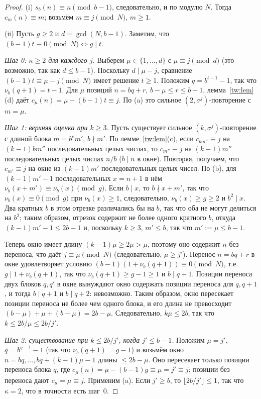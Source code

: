 \documentclass[a4paper,14pt]{extreport}
\theoremstyle{plain}
\theoremstyle{definition}
\theoremstyle{remark}
\begin{document}
\begin{proof}
	(i) $s_b(n)\equiv n\pmod{b-1}$, следовательно, и по модулю $N$. Тогда $c_m(n)\equiv m$; возьмём $m\equiv j\pmod N$, $m\ge1$.
	
	(ii) Пусть $g\ge2$ и $d=\gcd(N,b-1)$. Заметим, что $(b-1)t\equiv0\pmod N\iff g\mid t$.
	
	\emph{Шаг 0: $\kappa\ge2$ для каждого $j$.} Выберем $\mu\in\{1,\dots,d\}$ с $\mu\equiv j\pmod d$
	(это возможно, так как $d\le b-1$). Поскольку $d\mid\mu-j$, сравнение $(b-1)t\equiv\mu-j\pmod N$ имеет решение
	$t\ge1$. Положим $q=b^{t-1}-1$, так что $\nu_b(q+1)=t-1$. Для $\mu$ позиций $n=bq+r$, $b-\mu\le r\le b-1$,
	лемма~\ref{tw:lem}(d) даёт $c_\mu(n)=\mu-(b-1)t\equiv j$. По (a) это сильное $(2,\sigma^j)$-повторение с $m=\mu$.
	
	\emph{Шаг 1: верхняя оценка при $k\ge3$.} Пусть существует сильное $(k,\sigma^j)$-повторение с длиной блока $m=b^em'$, $b\nmid m'$.
	По лемме~\ref{tw:lem}(c), если $c_{bm''}\equiv j$ на $(k-1)bm''$ последовательных целых числах, то
	$c_{m''}\equiv j$ на $(k-1)m''$ последовательных целых числах $n/b$ ($b\mid n$ в окне).
	Повторяя, получаем, что $c_{m'}\equiv j$ на окне из $(k-1)m'$ последовательных целых чисел.
	По (b), для $(k-1)m'-1$ последовательных $x=n+1$ в нём $\nu_b(x+m')\equiv\nu_b(x)\pmod g$. Если $b\mid x$, то $b\nmid x+m'$,
	так что $\nu_b(x)\equiv0\pmod g$ при $\nu_b(x)\ge1$, следовательно, $\nu_b(x)\ge g\ge2$ и $b^2\mid x$.
	Два кратных $b$ в этом отрезке различались бы на $b$, так что оба не могут делиться на $b^2$; таким образом, отрезок
	содержит не более одного кратного $b$, откуда $(k-1)m'-1\le 2b-1$ и, поскольку $k\ge3$, $m'\le b$, так что $m':=\mu\le b-1$.
	
	Теперь окно имеет длину $(k-1)\mu\ge2\mu>\mu$, поэтому оно содержит $n$ без переноса, что даёт $j\equiv\mu\pmod N$
	(следовательно, $\mu\ge j'$). Перенос $n=bq+r$ в окне удовлетворяет условию
	$(b-1)(1+\nu_b(q+1))\equiv0\pmod N$, т.е.\ $g\mid 1+\nu_b(q+1)$, так что $\nu_b(q+1)\ge g-1\ge1$ и $b\mid q+1$.
	Позиции переноса двух блоков $q,q'$ в окне вынуждают окно содержать позиции переноса для $q,q+1$,
	и тогда $b\mid q+1$ и $b\mid q+2$: невозможно. Таким образом, окно пересекает позиции переноса не более чем одного блока, и его длина
	не превосходит $(b-\mu)+\mu+(b-\mu)=2b-\mu$. Следовательно, $k\mu\le2b$, так что $k\le 2b/\mu\le 2b/j'$.
	
	\emph{Шаг 2: существование при $k\le 2b/j'$, когда $j'\le b-1$.} Положим $\mu=j'$, $q=b^{g-1}-1$ (так что $\nu_b(q+1)=g-1$)
	и возьмём окно $n=bq,\dots,bq+(k-1)\mu-1$ длины $\le2b-\mu$.
	Оно пересекает только позиции переноса блока $q$, где
	$c_\mu(n)=\mu-(b-1)g\equiv\mu=j'\equiv j$; позиции без переноса дают $c_\mu=\mu\equiv j$. Применим (a).
	Если $j'\ge b$, то $\lfloor 2b/j'\rfloor\le1$, так что $\kappa=2$, что в точности есть шаг~0.
\end{proof}
\end{document}
